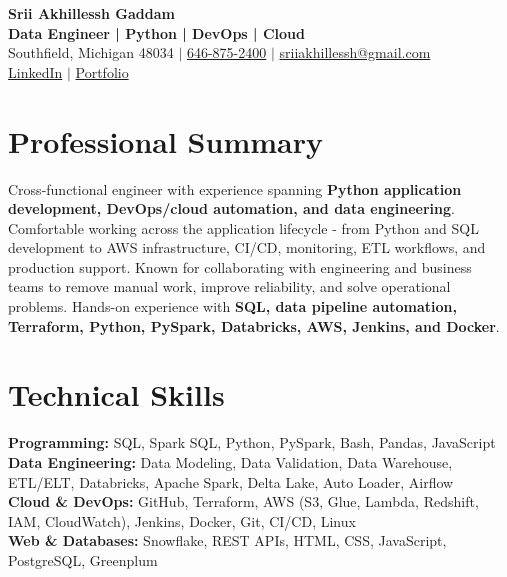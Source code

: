 \documentclass[letterpaper,10pt]{article}
\begin{document}
\fontsize{9.35pt}{10.45pt}\selectfont

\begin{center}
    {\LARGE \textbf{Srii Akhillessh Gaddam}} \\[-1pt]
    \textbf{Data Engineer | Python | DevOps | Cloud} \\[2pt]
    Southfield, Michigan 48034 $|$
    \href{tel:6468752400}{646-875-2400} $|$
    \href{mailto:sriiakhillessh@gmail.com}{sriiakhillessh@gmail.com} \\[1pt]
    \href{https://www.linkedin.com/in/srii-akhiilessh-gaddam-b48668191/}{LinkedIn} $|$
    \href{https://sriiakhillesshg.github.io/portfolio/}{Portfolio}
\end{center}
\vspace{-8pt}

\section{Professional Summary}
\small{Cross-functional engineer with experience spanning \textbf{Python application development, DevOps/cloud automation, and data engineering}. Comfortable working across the application lifecycle - from Python and SQL development to AWS infrastructure, CI/CD, monitoring, ETL workflows, and production support. Known for collaborating with engineering and business teams to remove manual work, improve reliability, and solve operational problems. Hands-on experience with \textbf{SQL, data pipeline automation, Terraform, Python, PySpark, Databricks, AWS, Jenkins, and Docker}.}

\section{Technical Skills}
\small{
\textbf{Programming:} SQL, Spark SQL, Python, PySpark, Bash, Pandas, JavaScript \\
\textbf{Data Engineering:} Data Modeling, Data Validation, Data Warehouse, ETL/ELT, Databricks, Apache Spark, Delta Lake, Auto Loader, Airflow \\
\textbf{Cloud \& DevOps:} GitHub, Terraform, AWS (S3, Glue, Lambda, Redshift, IAM, CloudWatch), Jenkins, Docker, Git, CI/CD, Linux \\
\textbf{Web \& Databases:} Snowflake, REST APIs, HTML, CSS, JavaScript, PostgreSQL, Greenplum
}
\end{document}
